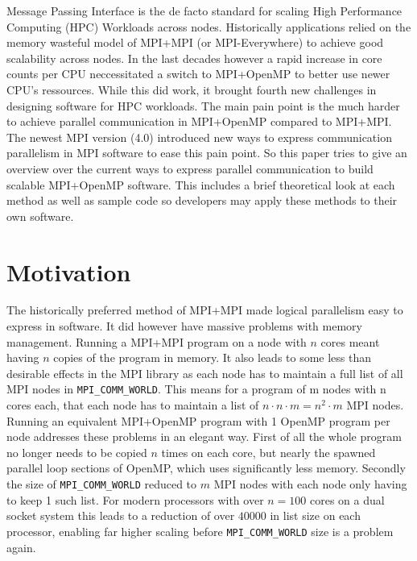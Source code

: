 \documentclass[sigconf]{acmart}
\begin{document}
Message Passing Interface is the de facto standard for scaling High Performance Computing (HPC) Workloads across nodes.
Historically applications relied on the memory wasteful model of MPI+MPI (or MPI-Everywhere) to achieve good scalability across nodes.
In the last decades however a rapid increase in core counts per CPU neccessitated a switch to MPI+OpenMP to better use newer CPU's ressources.
While this did work, it brought fourth new challenges in designing software for HPC workloads.
The main pain point is the much harder to achieve parallel communication in MPI+OpenMP compared to MPI+MPI.
The newest MPI version (4.0) introduced new ways to express communication parallelism in MPI software to ease this pain point.
So this paper tries to give an overview over the current ways to express parallel communication to build scalable MPI+OpenMP software.
This includes a brief theoretical look at each method as well as sample code so developers may apply these methods to their own software.



\section{Motivation}
The historically preferred method of MPI+MPI made logical parallelism easy to express in software.
It did however have massive problems with memory management.
Running a MPI+MPI program on a node with $n$ cores meant having $n$ copies of the program in memory.
It also leads to some less than desirable effects in the MPI library as each node has to maintain a full list of all MPI nodes in \verb|MPI_COMM_WORLD|.
This means for a program of m nodes with n cores each, that each node has to maintain a list of $n \cdot n \cdot m = n^2 \cdot m$ MPI nodes.
Running an equivalent MPI+OpenMP program with 1 OpenMP program per node addresses these problems in an elegant way.
First of all the whole program no longer needs to be copied $n$ times on each core, but nearly the spawned parallel loop sections of OpenMP, which uses significantly less memory.
Secondly the size of \verb|MPI_COMM_WORLD| reduced to $m$ MPI nodes with each node only having to keep 1 such list.
For modern processors with over $n=100$ cores on a dual socket system this leads to a reduction of over $40000$ in list size on each processor, enabling far higher scaling before \verb|MPI_COMM_WORLD| size is a problem again.
\end{document}

